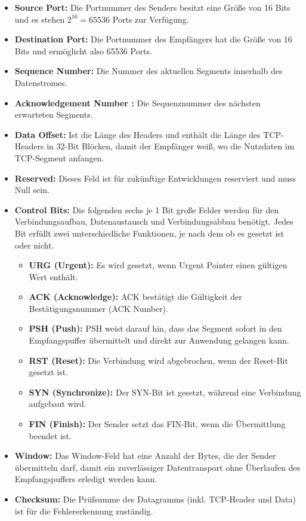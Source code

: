 \begin{itemize}
	\item \textbf{Source Port:} Die Portnummer des Senders besitzt eine Größe von 16 Bits und es stehen $2^{16} = 65536$ Ports zur Verfügung.
	\item \textbf{Destination Port:} Die Portnummer des Empfängers hat die Größe von 16 Bits und ermöglicht also 65536 Ports.
	\item \textbf{Sequence Number:} Die Nummer des aktuellen Segments innerhalb des Datenstromes.
	\item \textbf{Acknowledgement Number :} Die Sequenznummer des nächsten erwarteten Segments.
	\item \textbf{Data Offset:} Ist die Länge des Headers und enthält die Länge des TCP-Headers in 32-Bit Blöcken, damit der Empfänger weiß, wo die Nutzdaten im TCP-Segment anfangen.
	\item \textbf{Reserved:} Dieses Feld ist für zukünftige Entwicklungen reserviert und muss Null sein.
	\item \textbf{Control Bits:} Die folgenden sechs je 1 Bit große Felder werden für den Verbindungsaufbau, Datenaustausch und Verbindungsabbau benötigt. Jedes Bit erfüllt zwei unterschiedliche Funktionen, je nach dem ob es gesetzt ist oder nicht.
	\begin{itemize}
		\item \textbf{URG (Urgent):} Es wird gesetzt, wenn Urgent Pointer einen gültigen Wert enthält. 
		\item \textbf{ACK (Acknowledge):} ACK bestätigt die Gültigkeit der Bestätigungsnummer (ACK Number). 
		\item \textbf{PSH (Push):} PSH weist darauf hin, dass das Segment sofort in den Empfangspuffer übermittelt und direkt zur Anwendung gelangen kann.
		\item \textbf{RST (Reset):} Die Verbindung wird abgebrochen, wenn der Reset-Bit gesetzt ist.
		\item \textbf{SYN (Synchronize):} Der SYN-Bit ist gesetzt, während eine Verbindung aufgebaut wird. 
		\item \textbf{FIN (Finish):} Der Sender setzt das FIN-Bit, wenn die Übermittlung beendet ist.
	\end{itemize}
	\item \textbf{Window:} Das Window-Feld hat eine Anzahl der Bytes, die der Sender übermitteln darf, damit ein zuverlässiger Datentransport ohne Überlaufen des Empfangspuffers erledigt werden kann.
	\item \textbf{Checksum:} Die Prüfsumme des Datagramms (inkl. TCP-Header und Data) ist für die Fehlererkennung zuständig.

\end{itemize}
